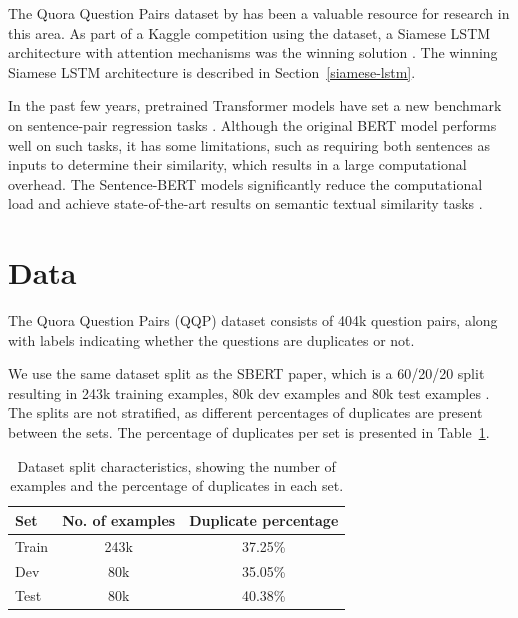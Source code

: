 \documentclass[10pt, a4paper]{article}
\begin{document}
The Quora Question Pairs dataset by \citet{iyer2017first} has been a valuable resource for research in this area.
As part of a Kaggle competition using the dataset, a Siamese LSTM architecture with attention mechanisms was the winning solution \citep{dadashov2017quora}.
The winning Siamese LSTM architecture is described in Section~\ref{siamese-lstm}.

In the past few years, pretrained Transformer models have set a new benchmark on sentence-pair regression tasks \citep{devlin2018bert}.
Although the original BERT model performs well on such tasks, it has some limitations, such as requiring both sentences as inputs to determine their similarity, which results in a large computational overhead.
The Sentence-BERT models significantly reduce the computational load and achieve state-of-the-art results on semantic textual similarity tasks \citep{reimers-2019-sentence-bert}.

\section{Data} \label{dataset}

The Quora Question Pairs (QQP) dataset consists of 404k question pairs, along with labels indicating whether the questions are duplicates or not.

We use the same dataset split as the SBERT paper, which is a 60/20/20 split resulting in 243k training examples, 80k dev examples and 80k test examples \citep{reimers-2019-sentence-bert}.
The splits are not stratified, as different percentages of duplicates are present between the sets. The percentage of duplicates per set is presented in Table~\ref{tab:duplicate-percentages}.

\begin{table}
\caption{Dataset split characteristics, showing the number of examples and the percentage of duplicates in each set.}
\label{tab:duplicate-percentages}
\begin{center}
\begin{tabular}{lcc}
\toprule
\textbf{Set} & \textbf{No. of examples} & \textbf{Duplicate percentage} \\
\midrule
Train & 243k & 37.25\% \\
Dev   & 80k  & 35.05\% \\
Test  & 80k  & 40.38\% \\
\bottomrule
\end{tabular}
\end{center}
\end{table}
\end{document}
